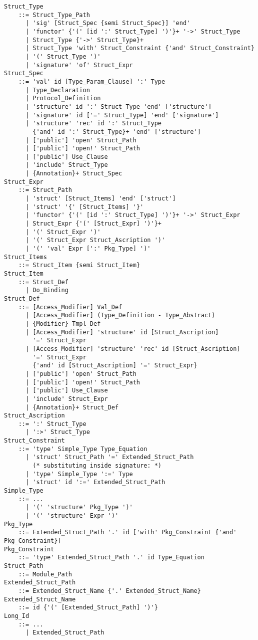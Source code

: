 \grammar\begin{lstlisting}
Struct_Type 
    ::= Struct_Type_Path
      | 'sig' [Struct_Spec {semi Struct_Spec}] 'end'
      | 'functor' {'(' [id ':' Struct_Type] ')'}+ '->' Struct_Type
      | Struct_Type {'->' Struct_Type}+
      | Struct_Type 'with' Struct_Constraint {'and' Struct_Constraint}
      | '(' Struct_Type ')'
      | 'signature' 'of' Struct_Expr
Struct_Spec 
    ::= 'val' id [Type_Param_Clause] ':' Type
      | Type_Declaration
      | Protocol_Definition
      | 'structure' id ':' Struct_Type 'end' ['structure']
      | 'signature' id ['=' Struct_Type] 'end' ['signature']
      | 'structure' 'rec' id ':' Struct_Type 
        {'and' id ':' Struct_Type}+ 'end' ['structure']
      | ['public'] 'open' Struct_Path
      | ['public'] 'open!' Struct_Path
      | ['public'] Use_Clause
      | 'include' Struct_Type
      | {Annotation}+ Struct_Spec
Struct_Expr 
    ::= Struct_Path
      | 'struct' [Struct_Items] 'end' ['struct']
      | 'struct' '{' [Struct_Items] '}'
      | 'functor' {'(' [id ':' Struct_Type] ')'}+ '->' Struct_Expr
      | Struct_Expr {'(' [Struct_Expr] ')'}+
      | '(' Struct_Expr ')'
      | '(' Struct_Expr Struct_Ascription ')'
      | '(' 'val' Expr [':' Pkg_Type] ')'
Struct_Items 
    ::= Struct_Item {semi Struct_Item} 
Struct_Item 
    ::= Struct_Def 
      | Do_Binding
Struct_Def 
    ::= [Access_Modifier] Val_Def
      | [Access_Modifier] (Type_Definition - Type_Abstract)
      | {Modifier} Tmpl_Def
      | [Access_Modifier] 'structure' id [Struct_Ascription] 
        '=' Struct_Expr
      | [Access_Modifier] 'structure' 'rec' id [Struct_Ascription] 
        '=' Struct_Expr 
        {'and' id [Struct_Ascription] '=' Struct_Expr}
      | ['public'] 'open' Struct_Path
      | ['public'] 'open!' Struct_Path
      | ['public'] Use_Clause
      | 'include' Struct_Expr
      | {Annotation}+ Struct_Def
Struct_Ascription 
    ::= ':' Struct_Type
      | ':>' Struct_Type
Struct_Constraint 
    ::= 'type' Simple_Type Type_Equation
      | 'struct' Struct_Path '=' Extended_Struct_Path
        (* substituting inside signature: *)
      | 'type' Simple_Type ':=' Type
      | 'struct' id ':=' Extended_Struct_Path
Simple_Type 
    ::= ...
      | '(' 'structure' Pkg_Type ')'
      | '(' 'structure' Expr ')'
Pkg_Type 
    ::= Extended_Struct_Path '.' id ['with' Pkg_Constraint {'and' Pkg_Constraint}]
Pkg_Constraint
    ::= 'type' Extended_Struct_Path '.' id Type_Equation 
Struct_Path
    ::= Module_Path
Extended_Struct_Path 
    ::= Extended_Struct_Name {'.' Extended_Struct_Name}
Extended_Struct_Name 
    ::= id {'(' [Extended_Struct_Path] ')'}
Long_Id
    ::= ...
      | Extended_Struct_Path
\end{lstlisting}






